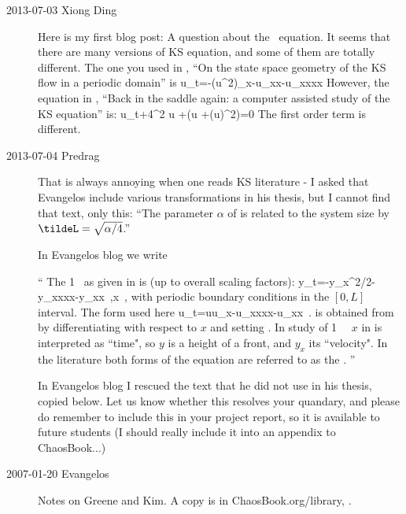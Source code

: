 \begin{description}
\item[2013-07-03 Xiong Ding] Here is my first blog post:
A question about the \KS\ equation.
It seems that there are many versions of KS equation,
and some of them are totally different.
The one you used in , ``On the state space geometry of
the KS flow in a periodic domain'' is
\beq
 u_t=-(u^2)_x-u_{xx}-u_{xxxx}
However, the
equation in , ``Back in the saddle again: a computer
assisted study of the KS equation'' is:
\beq
 u_t+4\bigtriangleup^2 u
    +\alpha (\bigtriangleup u +(\bigtriangledown u)^2)=0
The first order term is different.

\item[2013-07-04 Predrag] That is always annoying when one reads
KS literature - I asked that Evangelos include various transformations
in his thesis, but I cannot find that text, only this:
``The parameter $\alpha$ of  is
related to the system size by $\tildeL=\sqrt{\alpha/4}$.''

In Evangelos
 {blog} we write

``
The {1\dmn} \KSe\ as given in  is (up to overall scaling
factors):
\beq
    y_t=-y_x^2/2-y_{xxxx}-y_{xx}
\,,\qquad       x \in [0,L]
\,,
    \label{eq:KSeOR}
\eeq
with periodic boundary conditions in the $[0,L]$ interval. The form used
here
\beq
    u_t=uu_x-u_{xxxx}-u_{xx}
\,.
    \label{eq:KSeAP}
\eeq
is obtained from  by differentiating with respect to $x$
and setting .
In study of {1\dmn} \KS\ \eqva\ $x$ in 
is interpreted as ``time", so $y$ is a height of a front,
and $y_x$ its ``velocity".
In the literature  both forms of the equation are
referred to as the \KSe.
''

In Evangelos blog I rescued the text that he did not use in his thesis,
copied below.
Let us know whether this resolves your quandary,
and please do remember to include this in your project
report, so it is available to future students (I should really
include it into an appendix to ChaosBook...)            \toCB

\item[2007-01-20 Evangelos]
Notes on Greene and Kim. A copy is in ChaosBook.org/library,
.


\end{description}
